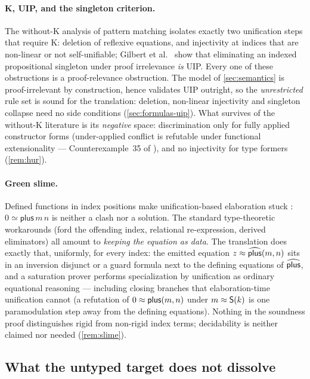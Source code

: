 \paragraph{K, UIP, and the singleton criterion.}  The without-K analysis
of pattern matching \cite{CockxEtAl2014,CockxDevriese2018} isolates
exactly two unification steps that require K: deletion of reflexive
equations, and injectivity at indices that are non-linear or not
self-unifiable; Gilbert et al.\ \cite{GilbertEtAl2019} show that
eliminating an indexed propositional singleton under proof irrelevance
\emph{is} UIP.  Every one of these obstructions is a proof-relevance
obstruction.  The model of \cref{sec:semantics} is proof-irrelevant by
construction, hence validates UIP outright, so the \emph{unrestricted}
rule set is sound for the translation: deletion, non-linear injectivity
and singleton collapse need no side conditions
(\cref{sec:formulas-uip}).  What survives of the without-K literature is
its \emph{negative} space: discrimination only for fully applied
constructor forms (under-applied conflict is refutable under functional
extensionality --- Counterexample~35 of \cite{CockxDevriese2018}), and no
injectivity for type formers (\cref{rem:hur}).

\paragraph{Green slime.}  Defined functions in index positions make
unification-based elaboration stuck \cite{McBride2014}: $0 \simeq
\mathsf{plus}\,m\,n$ is neither a clash nor a solution.  The standard
type-theoretic workarounds (ford the offending index, relational
re-expression, derived eliminators) all amount to \emph{keeping the
equation as data}.  The translation does exactly that, uniformly, for
every index: the emitted equation $z \approx
\widehat{\mathsf{plus}}(m,n)$ sits in an inversion disjunct or a guard
formula next to the defining equations of $\widehat{\mathsf{plus}}$, and a
saturation prover performs specialization by unification as ordinary
equational reasoning --- including closing branches that elaboration-time
unification cannot (a refutation of $0 \approx \mathsf{plus}(m,n)$ under
$m \approx \mathsf{S}(k)$ is one paramodulation step away from the defining
equations).  Nothing in the soundness proof distinguishes rigid from
non-rigid index terms; decidability is neither claimed nor needed
(\cref{rem:slime}).

\subsection{What the untyped target does not dissolve}
\label{sec:fording-obligations}

